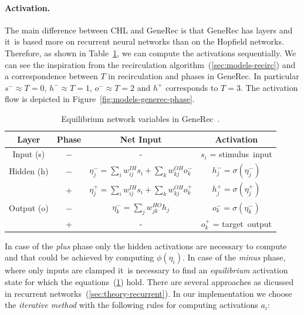 \paragraph{Activation.} 
\label{sec:models-generec-activation} 
The main difference between CHL and GeneRec is that GeneRec has layers and it~is based more on recurrent neural networks than on the Hopfield networks. Therefore, as shown in Table~\ref{tab:models-generec}, we can compute the activations sequentially. We can see the inspiration from the recirculation algorithm~(\ref{sec:models-recirc}) and a correspondence between $T$ in recirculation and phases in GeneRec. In particular $s^{-} \approx T=0$, $h^{-} \approx T=1$, $o^{-} \approx T=2$ and $h^{+}$ corresponds to $T=3$. The activation flow is depicted in Figure~\ref{fig:models-generec-phase}.
\begin{table}[H]
  \centering
  \begin{tabular}{|cccc|}
    \hline
    Layer & Phase & Net Input & Activation\\
    \hline
    Input (s)    & $-$ & - & $s_i$ = \mbox{stimulus input} \\
    \hline
    Hidden (h)   & $-$ & \hspace{0.3cm}$\eta^{-}_j = \sum_i w_{ij}^{IH}s_i + \sum_k w_{kj}^{OH}o^{-}_k$\hspace{0.3cm} &
    $h^{-}_j = \sigma(\eta^{-}_j)$\hspace{0.3cm}\\
          &  +  & $\eta^{+}_j = \sum_{i}w_{ij}^{IH}s_i + \sum_k w_{kj}^{OH}o^{+}_k$ & $h^{+}_{j} = \sigma(\eta^{+}_j)$ \\
    \hline
    Output (o) & $-$ & $\eta^{-}_k = \sum_j w_{jk}^{HO}h_j$ & $o^{-}_k = \sigma(\eta^{-}_k)$\\
           &  +  & - & $o^{+}_k$ = \mbox{target output} \\ %
    \hline
  \end{tabular}
  \caption{Equilibrium network variables in GeneRec~\citep{o1996bio}.}
  \label{tab:models-generec}
\end{table}
In case of the \emph{plus} phase only the hidden activations are necessary to compute and that could be achieved by computing $\phi(\eta_i)$. In case of the \emph{minus} phase, where only inputs are clamped it~is necessary to find an \emph{equilibrium} activation state for which the equations~(\ref{tab:models-generec}) hold. There are several approaches as dicussed in recurrent networks~(\ref{sec:theory-recurrent}). In our implementation we choose the \emph{iterative method} with the following rules for computing activations $a_i$: 
